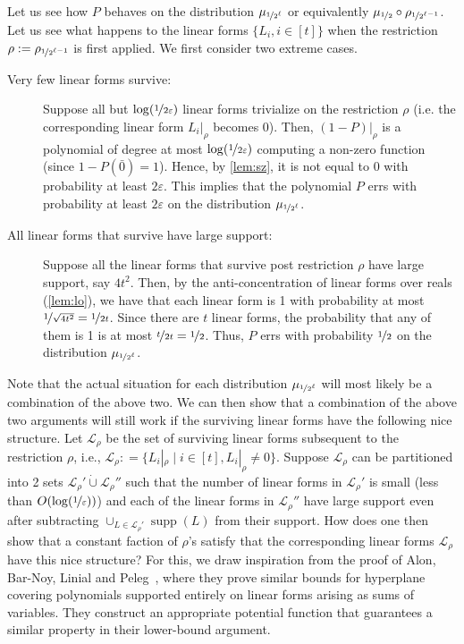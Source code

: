 \documentclass[10pt,a4paper]{article}
\theoremstyle{plain}
\theoremstyle{definition}
\renewcommand{\epsilon}{\varepsilon}
\newcommand{\eps}{\epsilon}
\newcommand{\disjunion}{\mathbin{\dot{\cup}}}
\newcommand{\union}{\mathbin{\cup}}
\newcommand{\supp}{\operatorname{supp}}
\newcommand{\calL}{{\mathcal{L}}}
\newcommand{\bra}[1]{\{#1\}}
\newcommand{\half}{\nicefrac{1}{2}}
\renewcommand{\calL}{\mathcal{L}}
\newcommand{\lepsinv}{\log(\nicefrac1\eps)}
\begin{document}
    Let us see how $P$ behaves on the
    distribution $\mu_{\nicefrac1{2^{\ell}}}$ or equivalently $\mu_{\half} \circ
    \rho_{\nicefrac1{2^{\ell-1}}}$. Let us see what happens to the linear forms
    $\bra{L_i, i \in [t]}$ when the restriction $\rho:=\rho_{\nicefrac1{2^{\ell-1}}}$ is first
    applied. We first consider two extreme cases.
    \begin{description}
        \item[Very few linear forms survive:] Suppose all but $\log
            (\nicefrac1{2\eps})$ linear forms trivialize on the restriction $\rho$ (i.e. the
            corresponding linear form $L_i|_{\rho}$ becomes 0). Then,
            $(1-P)|_{\rho}$ is a polynomial of degree at most $\log
            (\nicefrac1{2\eps})$ computing a non-zero function (since $1-P(\bar{0}) = 1$). Hence, by \cref{lem:sz}, it is not equal to 0
            with probability at least $2\eps$. This implies that the polynomial
            $P$ errs with probability at least $2\eps$ on the distribution $\mu_{\nicefrac1{2^{\ell}}}$.
        \item[All linear forms that survive have large support:] Suppose all the
            linear forms that survive post restriction $\rho$ have large
            support, say $4t^2$. Then, by the anti-concentration of linear
            forms over reals (\cref{lem:lo}), we have that
            each linear form is 1 with probability at most
            $\nicefrac1{\sqrt{4t^2}} = \nicefrac1{2t}$. Since there are $t$ linear forms, the
            probability that any of them is 1 is at most
            $\nicefrac{t}{2t}  = \half$. Thus, $P$ errs with probability  $\half$ on the distribution 
            $\mu_{\nicefrac1{2^{\ell}}}$.
    \end{description}

    Note that the actual situation for each distribution
    $\mu_{\nicefrac1{2^{\ell}}}$ will most likely be a combination of the above
    two. We can then show that a combination of the above two arguments
    will still work if the surviving linear forms have the following nice
    structure. Let $\calL_{\rho}$ be the set of surviving linear forms
    subsequent to the restriction $\rho$, i.e., $\calL_\rho : = \{ L_i|_\rho
    \mid i \in[t], L_i|_\rho \neq 0\}$. Suppose $\calL_\rho$ can be
    partitioned into 2 sets $\calL_\rho' \disjunion \calL_\rho''$ such that
    the number of linear forms in $\calL_\rho'$ is small (less than
    $O(\lepsinv)$) and each of the linear forms in $\calL_\rho''$
    have large support even after subtracting $\union_{L \in
    \calL_\rho'}\supp(L)$ from their support. How does one then show that a constant
    faction of $\rho$'s satisfy that the corresponding linear forms
    $\calL_\rho$ have this nice structure? For this, we draw inspiration
    from the proof of Alon, Bar-Noy, Linial and
    Peleg~\cite{AlonBLP1991}, where they prove similar bounds for
    hyperplane covering polynomials supported entirely on linear forms
    arising as sums of variables. They construct an appropriate
    potential function that guarantees a similar property in their
    lower-bound argument. 
    
\end{document}
